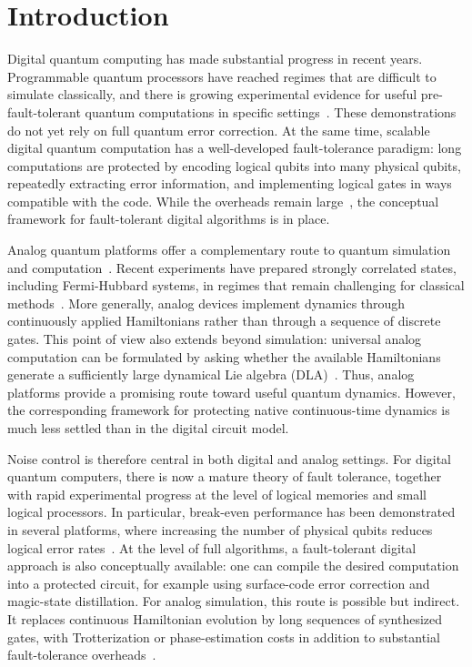 \documentclass[10pt,twocolumn,superscriptaddress,aps,amsmath,amssymb,citeautoscript,floatfix,prx,longbibliography]{revtex4-2}
\newcounter{alg}
\theoremstyle{plain}
\theoremstyle{plain}
\theoremstyle{plain}
\theoremstyle{plain}
\theoremstyle{plain}
\theoremstyle{plain}
\begin{document}
\section{Introduction}\label{sec:main_intro}

Digital quantum computing has made substantial progress in recent years. Programmable quantum processors have reached regimes that are difficult to simulate classically, and there is growing experimental evidence for useful pre-fault-tolerant quantum computations in specific settings~\cite{Arute2019,Kim2023}. These demonstrations do not yet rely on full quantum error correction. At the same time, scalable digital quantum computation has a well-developed fault-tolerance paradigm: long computations are protected by encoding logical qubits into many physical qubits, repeatedly extracting error information, and implementing logical gates in ways compatible with the code. While the overheads remain large~\cite{Fowler2019, Gidney2021}, the conceptual framework for fault-tolerant digital algorithms is in place.

Analog quantum platforms offer a complementary route to quantum simulation and computation~\cite{Bloch2012,Browaeys2020,Daley2022,Schaefer2020}. Recent experiments have prepared strongly correlated states, including Fermi-Hubbard systems, in regimes that remain challenging for classical methods~\cite{Xu2025,Mazurenko2017,Shao2024,Chalopin2024}. More generally, analog devices implement dynamics through continuously applied Hamiltonians rather than through a sequence of discrete gates. This point of view also extends beyond simulation: universal analog computation can be formulated by asking whether the available Hamiltonians generate a sufficiently large dynamical Lie algebra (DLA)~\cite{Tavis1968,DAlessandro2021,Chen2020,Albertini2018,Albertini2020,Wang2016,Wang2012,Zanardi2004,AlbertiniDAlessandro2025,Hu2025}. Thus, analog platforms provide a promising route toward useful quantum dynamics. However, the corresponding framework for protecting native continuous-time dynamics is much less settled than in the digital circuit model.

Noise control is therefore central in both digital and analog settings. For digital quantum computers, there is now a mature theory of fault tolerance, together with rapid experimental progress at the level of logical memories and small logical processors. In particular, break-even performance has been demonstrated in several platforms, where increasing the number of physical qubits reduces logical error rates~\cite{Krinner2022,AcharyaGoogle2025,RyanAnderson2021,daSilvaPaetznick2024,Reichardt2024Tesseract,Bluvstein2024,Reichardt2024NeutralAtom}. At the level of full algorithms, a fault-tolerant digital approach is also conceptually available: one can compile the desired computation into a protected circuit, for example using surface-code error correction and magic-state distillation. For analog simulation, this route is possible but indirect. It replaces continuous Hamiltonian evolution by long sequences of synthesized gates, with Trotterization or phase-estimation costs in addition to substantial fault-tolerance overheads~\cite{Reiher2017ReactionMechanisms,Kivlichan2020Trotter}.
\end{document}
